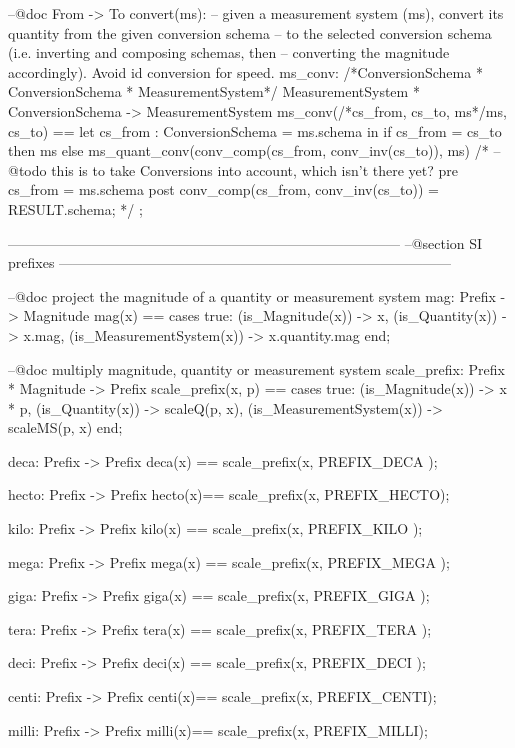 \documentclass[a4paper]{article}
\begin{document}
\begin{vdm_al}
 --@doc From -> To convert(ms): 
 --     given a measurement system (ms), convert its quantity from the given conversion schema 
 --     to the selected conversion schema (i.e. inverting and composing schemas, then
 --     converting the magnitude accordingly). Avoid id conversion for speed.
 ms_conv: /*ConversionSchema * ConversionSchema * MeasurementSystem*/ MeasurementSystem * ConversionSchema -> MeasurementSystem
 ms_conv(/*cs_from, cs_to, ms*/ms, cs_to) == 
  let
   cs_from : ConversionSchema = ms.schema
   in
   if cs_from = cs_to then 
    ms
   else
    ms_quant_conv(conv_comp(cs_from, conv_inv(cs_to)), ms)
 /*
 --@todo this is to take Conversions into account, which isn't there yet? 
 pre
  cs_from = ms.schema
 post
  conv_comp(cs_from, conv_inv(cs_to)) = RESULT.schema;
 */ 
 ;

------------------------------------------------------------------------------------
--@section SI prefixes
------------------------------------------------------------------------------------
 
 --@doc project the magnitude of a quantity or measurement system
 mag: Prefix -> Magnitude
 mag(x) == 
  cases true:
   (is_Magnitude(x))         -> x,
   (is_Quantity(x))          -> x.mag,
   (is_MeasurementSystem(x)) -> x.quantity.mag
  end;

 --@doc multiply magnitude, quantity or measurement system
 scale_prefix: Prefix * Magnitude -> Prefix
 scale_prefix(x, p) == 
  cases true:
   (is_Magnitude(x))         -> x * p,
   (is_Quantity(x))          -> scaleQ(p, x),
   (is_MeasurementSystem(x)) -> scaleMS(p, x)
  end;

 deca: Prefix -> Prefix
 deca(x) == scale_prefix(x, PREFIX_DECA );

 hecto: Prefix -> Prefix
 hecto(x)== scale_prefix(x, PREFIX_HECTO);

 kilo: Prefix -> Prefix
 kilo(x) == scale_prefix(x, PREFIX_KILO );

 mega: Prefix -> Prefix
 mega(x) == scale_prefix(x, PREFIX_MEGA );

 giga: Prefix -> Prefix
 giga(x) == scale_prefix(x, PREFIX_GIGA );

 tera: Prefix -> Prefix
 tera(x) == scale_prefix(x, PREFIX_TERA );
 
 deci: Prefix -> Prefix
 deci(x) == scale_prefix(x, PREFIX_DECI );

 centi: Prefix -> Prefix
 centi(x)== scale_prefix(x, PREFIX_CENTI);

 milli: Prefix -> Prefix
 milli(x)== scale_prefix(x, PREFIX_MILLI);


\end{vdm_al}
\end{document}
